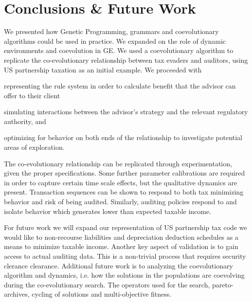 \section{Conclusions \& Future Work}
\label{sec:conclusions--future}

We presented how Genetic Programming, grammars and coevolutionary
algorithms could be used in practice. We expanded on the role of
dynamic environments and coevolution in GE. We used a coevolutionary
algorithm to replicate the co-evolutionary relationship between tax
evaders and auditors, using US partnership taxation as an initial
example. We proceeded with
\begin{inparaenum}[\itshape (1)]
\item representing the rule system in order to calculate benefit that
  the advisor can offer to their client
\item simulating interactions between the advisor's strategy and the
  relevant regulatory authority, and
\item optimizing for behavior on both ends of the relationship to
  investigate potential areas of exploration.
\end{inparaenum}

The co-evolutionary relationship can be replicated through
experimentation, given the proper specifications. Some further
parameter calibrations are required in order to capture certain time
scale effects, but the qualitative dynamics are present. Transaction
sequences can be shown to respond to both tax minimizing behavior and
risk of being audited. Similarly, auditing policies respond to and
isolate behavior which generates lower than expected taxable income.

For future work we will expand our representation of US partnership
tax code we would like to non-recourse liabilities and depreciation
deduction schedules as a means to minimize taxable income. Another key
aspect of validation is to gain access to actual auditing data. This
is a non-trivial process that requires security clerance clearance.
Additional future work is to analyzing the coevolutionary algorithm
and dynamics, i.e. how the solutions in the populations are coevolving
during the co-evolutionary search. The operators used for the search,
pareto-archives, cycling of solutions and multi-objective fitness.
